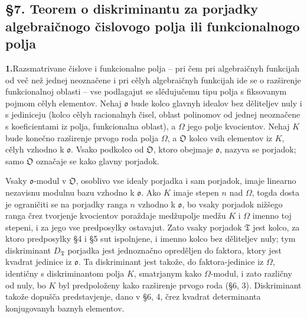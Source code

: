 \documentclass[11pt]{article}
\newcommand{\mo}{\mathfrak{o}}
\newcommand{\mO}{\mathfrak{O}}
\newcommand{\mT}{\mathfrak{T}}
\begin{document}
\setcounter{footnote}{28}

\subsection*{§7. Teorem o diskriminantu za porjadky algebraičnogo čislovogo polja ili funkcionalnogo polja}

\noindent\textbf{1.}\quad Razsmatrivane čislove i funkcionalne polja -- pri čem pri algebraičnyh funkcijah od več než jednej neoznačene i pri cělyh algebraičnyh funkcijah ide se o razširenje funkcionalnoj oblasti -- vse podlagajut se slědujučemu tipu polja s fiksovanym pojmom cělyh elementov. Nehaj $\mo$ bude kolco glavnyh idealov bez děliteljev nuly i s jediniceju (kolco cělyh racionalnyh čisel, oblast polinomov od jednej neoznačene s koeficientami iz polja, funkcionalna oblast), a $\Omega$ jego polje kvocientov. Nehaj $K$ bude konečno razširenje prvogo roda polja $\Omega$, a $\mO$ kolco vsih elementov iz $K$, cělyh vzhodno k $\mo$. Vsako podkolco od $\mO$, ktoro obejmaje $\mo$, nazyva se porjadok; samo $\mO$ označaje se kako glavny porjadok.

Vsaky $\mo$-modul v $\mO$, osoblivo vse idealy porjadka i sam porjadok, imaje linearno nezavisnu modulnu bazu vzhodno k $\mo$. Ako $K$ imaje stepen $n$ nad $\Omega$, togda dosta je ograničiti se na porjadky ranga $n$ vzhodno k $\mo$, bo vsaky porjadok nižšego ranga črez tvorjenje kvocientov poraždaje medžupolje medžu $K$ i $\Omega$ imenno toj stepeni, i za jego vse predposylky ostavajut. Zato vsaky porjadok $\mT$ jest kolco, za ktoro predposylky §4 i §5 sut ispolnjene, i imenno kolco bez děliteljev nuly; tym diskriminant $D_\mT$ porjadka jest jednoznačno opreděljen do faktora, ktory jest kvadrat jedinice iz $\mo$. Ta diskriminant jest takože, do faktora-jedinice iz $\Omega$, identičny s diskriminantom polja $K$, smatrjanym kako $\Omega$-modul, i zato različny od nuly, bo $K$ byl predpoloženy kako razširenje prvogo roda (§6, 3). Diskriminant takože dopušča predstavjenje, dano v §6, 4, črez kvadrat determinanta konjugovanyh baznyh elementov.
\end{document}
